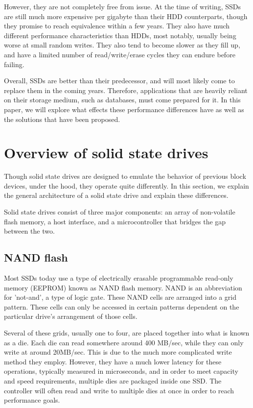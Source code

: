 \documentclass[format=acmsmall, review=false, screen=true]{acmart}
\begin{document}
However, they are not completely free from issue. At the time of writing, SSDs are still much more expensive per gigabyte 
than their HDD counterparts, though they promise to reach equivalence within a few years. They also have much different 
performance characteristics than HDDs, most notably, usually being worse at small random writes. They also tend to become 
slower as they fill up, and have a limited number of read/write/erase cycles they can endure before failing. 
\cite{Dumitru2007, Dirik2009, Xie2011}

Overall, SSDs are better than their predecessor, and will most likely come to replace them in the coming years. Therefore, 
applications that are heavily reliant on their storage medium, such as databases, must come prepared for it. In this paper, 
we will explore what effects these performance differences have as well as the solutions that have been proposed.

\section{Overview of solid state drives}

Though solid state drives are designed to emulate the behavior of previous block devices, under the hood, they operate 
quite differently. \cite{Lee2008, Dirik2009, Cornwell2012, Micheloni2013, MatejFucek2014, Chen2016} In this section, we 
explain the general architecture of a solid state drive and explain these differences.

Solid state drives consist of three major components: an array of non-volatile flash memory, a host interface, and a 
microcontroller that bridges the gap between the two. 

\subsection{NAND flash}

Most SSDs today use a type of electrically erasable programmable read-only memory (EEPROM) known as NAND flash memory. 
NAND is an abbreviation for 'not-and', a type of logic gate. These NAND cells are arranged into a grid pattern. These 
cells can only be accessed in certain patterns dependent on the particular drive's arrangement of those cells. 
\cite{Dirik2009, Cornwell2012, Micheloni2013, Chen2016}

Several of these grids, usually one to four, are placed together into what is known as a die. Each die can read somewhere 
around 400 MB/sec, while they can only write at around 20MB/sec. This is due to the much more complicated write method 
they employ. However, they have a much lower latency for these operations, typically measured in microseconds, and in 
order to meet capacity and speed requirements, multiple dies are packaged inside one SSD. The controller will often 
read and write to multiple dies at once in order to reach performance goals. 
\cite{Dirik2009, Cornwell2012, Micheloni2013, Chen2016}
\end{document}
